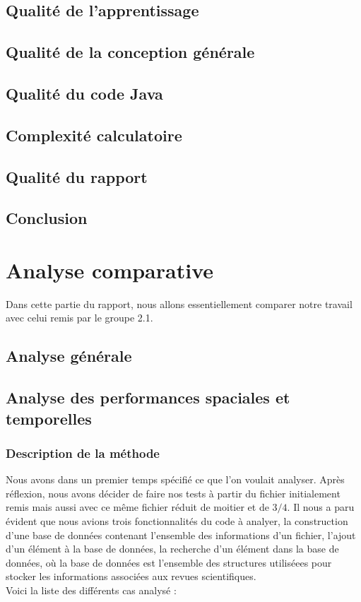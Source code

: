 \documentclass[a4paper ,12pt]{article}
\begin{document}
\subsection{Qualité de l'apprentissage}

\subsection{Qualité de la conception générale}

\subsection{Qualité du code Java}

\subsection{Complexité calculatoire}

\subsection{Qualité du rapport}

\subsection{Conclusion}

\section{Analyse comparative}
Dans cette partie du rapport, nous allons essentiellement comparer notre travail avec celui remis par le groupe 2.1.
\subsection{Analyse générale}

\subsection{Analyse des performances spaciales et temporelles}

\subsubsection{Description de la méthode}

Nous avons dans un premier temps spécifié ce que l'on voulait analyser. Après réflexion, nous avons décider de faire nos tests à partir du fichier initialement remis mais aussi avec ce même fichier réduit de moitier et de $3/4$. Il nous a paru évident que nous avions trois fonctionnalités du code à analyer, la construction d'une base de données contenant l'ensemble des informations d'un fichier, l'ajout d'un élément à la base de données, la recherche d'un élément dans la base de données, où la base de données est l'ensemble des structures utiliséees pour stocker les informations associées aux revues scientifiques. \\
Voici la liste des différents cas analysé :
\end{document}
